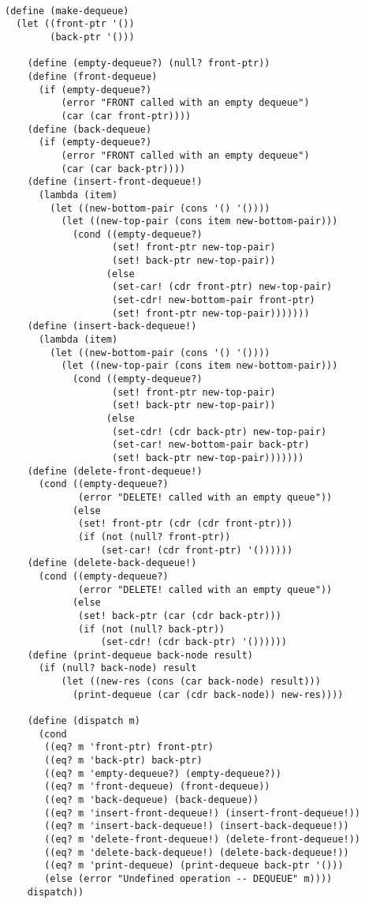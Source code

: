\documentclass[10pt,a4paper]{article}
\begin{document}
\begin{lstlisting}

(define (make-dequeue)
  (let ((front-ptr '())
        (back-ptr '()))

    (define (empty-dequeue?) (null? front-ptr))
    (define (front-dequeue)
      (if (empty-dequeue?)
          (error "FRONT called with an empty dequeue")
          (car (car front-ptr))))
    (define (back-dequeue)
      (if (empty-dequeue?)
          (error "FRONT called with an empty dequeue")
          (car (car back-ptr))))
    (define (insert-front-dequeue!)
      (lambda (item)
        (let ((new-bottom-pair (cons '() '())))
          (let ((new-top-pair (cons item new-bottom-pair)))
            (cond ((empty-dequeue?)
                   (set! front-ptr new-top-pair)
                   (set! back-ptr new-top-pair))
                  (else
                   (set-car! (cdr front-ptr) new-top-pair)
                   (set-cdr! new-bottom-pair front-ptr)
                   (set! front-ptr new-top-pair)))))))
    (define (insert-back-dequeue!)
      (lambda (item)
        (let ((new-bottom-pair (cons '() '())))
          (let ((new-top-pair (cons item new-bottom-pair)))
            (cond ((empty-dequeue?)
                   (set! front-ptr new-top-pair)
                   (set! back-ptr new-top-pair))
                  (else
                   (set-cdr! (cdr back-ptr) new-top-pair)
                   (set-car! new-bottom-pair back-ptr)
                   (set! back-ptr new-top-pair)))))))
    (define (delete-front-dequeue!)
      (cond ((empty-dequeue?)
             (error "DELETE! called with an empty queue"))
            (else
             (set! front-ptr (cdr (cdr front-ptr)))
             (if (not (null? front-ptr))
                 (set-car! (cdr front-ptr) '())))))
    (define (delete-back-dequeue!)
      (cond ((empty-dequeue?)
             (error "DELETE! called with an empty queue"))
            (else
             (set! back-ptr (car (cdr back-ptr)))
             (if (not (null? back-ptr))
                 (set-cdr! (cdr back-ptr) '())))))
    (define (print-dequeue back-node result)
      (if (null? back-node) result
          (let ((new-res (cons (car back-node) result)))
            (print-dequeue (car (cdr back-node)) new-res))))
    
    (define (dispatch m)
      (cond
       ((eq? m 'front-ptr) front-ptr)
       ((eq? m 'back-ptr) back-ptr)
       ((eq? m 'empty-dequeue?) (empty-dequeue?))
       ((eq? m 'front-dequeue) (front-dequeue))
       ((eq? m 'back-dequeue) (back-dequeue))
       ((eq? m 'insert-front-dequeue!) (insert-front-dequeue!))
       ((eq? m 'insert-back-dequeue!) (insert-back-dequeue!))
       ((eq? m 'delete-front-dequeue!) (delete-front-dequeue!))
       ((eq? m 'delete-back-dequeue!) (delete-back-dequeue!))
       ((eq? m 'print-dequeue) (print-dequeue back-ptr '()))
       (else (error "Undefined operation -- DEQUEUE" m))))
    dispatch))


\end{lstlisting}
\end{document}
